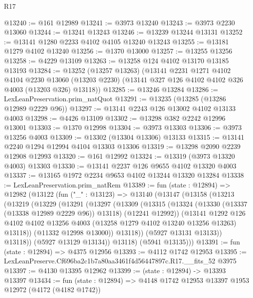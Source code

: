 \begin{lexlean}{R17}
\begin{coremodule}
@13240 := @161 @12989
@13241 := @3973 @13240
@13243 := @3973 @2230 @13060
@13244 := @13241 @13243
@13246 := @13239 @13244 @13131
@13252 := @13141 @1280 @2233 @4102 @4105 @13240 @13243
@13255 := @13181 @1279 @4102 @13240
@13256 := @1370 @13000
@13257 := @13255 @13256
@13258 := @4229 @13109
@13263 := @13258 @124 @4102 @13170 @13185 @13193
@13284 := @13252
    (@13257 @13263)
    (@13141
      @2231
      @1271
      @4102
      @4104
      @2230
      @13060
      (@13203 @2230)
      (@13141 @327 @126 @4102 @4102 @326 @4003 (@13203 @326) @13118))
@13285 := @13246 @13284
@13286 := LexLeanPreservation.prim_natQuot
@13291 := @13235 (@13285 (@13286 @12989 @2229 @96))
@13297 := @13141 @2243 @126 @13002 @4102 @13133 @4003
@13298 := @4426 @13109
@13302 := @13298 @382 @2242 @12996 @13001
@13303 := @1370 @12998
@13304 := @3973 @13303
@13306 := @3973 @13256 @4003
@13309 := @13302 (@13304 @13306) @13133
@13315 := @13141 @2240 @1294 @12994 @4104 @13303 @13306
@13319 := @13298 @2090 @2239 @12908 @12993
@13320 := @161 @12992
@13324 := @13319 (@3973 @13320 @4003) @13303
@13330 := @13141 @2237 @126 @9655 @4102 @13320 @4003
@13337 := @13165 @1972 @2234 @9653 @4102 @13244 @13320 @13284
@13338 := LexLeanPreservation.prim_natRem
@13389 := fun (state : @12894) =>
  @12982
    (@13122
      (fun ("_" : @13123) =>
      @13140
        (@13147
          (@13158
            (@13213
              (@13219
                (@13229
                  (@13291
                    (@13297
                      (@13309
                        (@13315
                          (@13324
                            (@13330 (@13337 (@13338 @12989 @2229 @96)) @13118)
                            (@12241 @12992))
                          (@13141
                            @1292
                            @126
                            @4102
                            @4102
                            @13256
                            @4003
                            (@13258 @1279 @4102 @13240 @13256 @13263)
                            @13118))
                        (@11332 @12998 @13000))
                      @13118))
                  (@5927 @13131 @13133))
                @13118))
            (@5927 @13129 @13134))
          @13118)
        (@5941 @13135)))
@13391 := fun (state : @12894) => @4375 @12956
@13393 := @4112 @1742 @12953
@13395 := LexLeanPreserve.Cf696ba2c1b7a80aa3461f4d56447897c.R17.__fits_52 @3975
@13397 := @4130 @13395 @12962
@13399 := (state : @12894) -> @13393 @13397
@13434 := fun (state : @12894) =>
  @4148
    @1742
    @12953
    @13397
    @1953
    @12972
    (@4172 (@4182 @1742))

\end{coremodule}
\end{lexlean}
